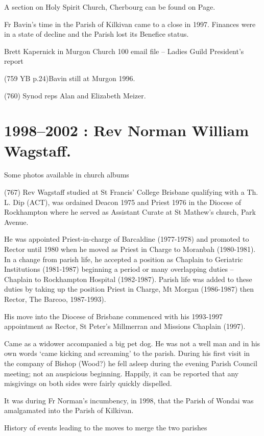 A section on Holy Spirit Church, Cherbourg can be found on Page.

Fr Bavin's time in the Parish of Kilkivan came to a close in 1997.
Finances were in a state of decline and the Parish lost its Benefice
status.

Brett Kapernick in Murgon Church 100 email file -- Ladies Guild
President's report

(759 YB p.24)Bavin still at Murgon 1996.

(760) Synod reps Alan and Elizabeth Meizer.

\hypertarget{rev-norman-william-wagstaff.}{%
\chapter{1998--2002 : Rev Norman William
Wagstaff.}\label{rev-norman-william-wagstaff.}}

Some photos available in church albums

(767) Rev Wagstaff studied at St Francis' College Brisbane qualifying
with a Th. L. Dip (ACT), was ordained Deacon 1975 and Priest 1976 in the
Diocese of Rockhampton where he served as Assistant Curate at St
Mathew's church, Park Avenue.

He was appointed Priest-in-charge of Barcaldine (1977-1978) and promoted
to Rector until 1980 when he moved as Priest in Charge to Moranbah
(1980-1981). In a change from parish life, he accepted a position as
Chaplain to Geriatric Institutions (1981-1987) beginning a period or
many overlapping duties -- Chaplain to Rockhampton Hospital (1982-1987).
Parish life was added to these duties by taking up the position Priest
in Charge, Mt Morgan (1986-1987) then Rector, The Barcoo, 1987-1993).

His move into the Diocese of Brisbane commenced with his 1993-1997
appointment as Rector, St Peter's Millmerran and Missions Chaplain
(1997).

Came as a widower accompanied a big pet dog. He was not a well man and
in his own words `came kicking and screaming' to the parish. During his
first visit in the company of Bishop (Wood?) he fell asleep during the
evening Parish Council meeting; not an auspicious beginning. Happily, it
can be reported that any misgivings on both sides were fairly quickly
dispelled.

It was during Fr Norman's incumbency, in 1998, that the Parish of Wondai
was amalgamated into the Parish of Kilkivan.

History of events leading to the moves to merge the two parishes

